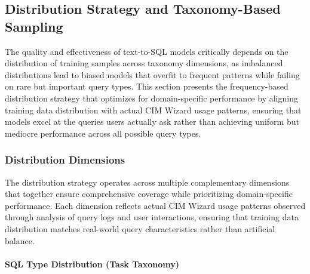 \subsection{Distribution Strategy and Taxonomy-Based Sampling}
\label{subsec:distribution_strategy}

The quality and effectiveness of text-to-SQL models critically depends on the distribution of training samples across taxonomy dimensions, as imbalanced distributions lead to biased models that overfit to frequent patterns while failing on rare but important query types. This section presents the frequency-based distribution strategy that optimizes for domain-specific performance by aligning training data distribution with actual CIM Wizard usage patterns, ensuring that models excel at the queries users actually ask rather than achieving uniform but mediocre performance across all possible query types.

\subsubsection{Distribution Dimensions}

The distribution strategy operates across multiple complementary dimensions that together ensure comprehensive coverage while prioritizing domain-specific performance. Each dimension reflects actual CIM Wizard usage patterns observed through analysis of query logs and user interactions, ensuring that training data distribution matches real-world query characteristics rather than artificial balance.

\paragraph{SQL Type Distribution (Task Taxonomy)}

